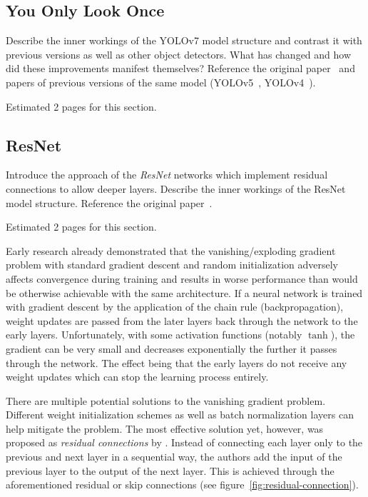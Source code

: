 \documentclass[draft,final]{vutinfth} %
\begin{document}
\subsection{You Only Look Once}
\label{sec:methods-detection}

Describe the inner workings of the YOLOv7 model structure and contrast
it with previous versions as well as other object detectors. What has
changed and how did these improvements manifest themselves? Reference
the original paper~\cite{wang2022} and papers of previous versions of
the same model (YOLOv5~\cite{jocher2022},
YOLOv4~\cite{bochkovskiy2020}).

Estimated 2 pages for this section.

\subsection{ResNet}
\label{sec:methods-classification}

Introduce the approach of the \emph{ResNet} networks which implement
residual connections to allow deeper layers. Describe the inner
workings of the ResNet model structure. Reference the original
paper~\cite{he2016}.

Estimated 2 pages for this section.

Early research \cite{bengio1994,glorot2010} already demonstrated that
the vanishing/exploding gradient problem with standard gradient
descent and random initialization adversely affects convergence during
training and results in worse performance than would be otherwise
achievable with the same architecture. If a neural network is trained
with gradient descent by the application of the chain rule
(backpropagation), weight updates are passed from the later layers
back through the network to the early layers. Unfortunately, with some
activation functions (notably $\tanh$), the gradient can be very small
and decreases exponentially the further it passes through the
network. The effect being that the early layers do not receive any
weight updates which can stop the learning process entirely.

There are multiple potential solutions to the vanishing gradient
problem. Different weight initialization schemes
\cite{glorot2010,sussillo2015} as well as batch normalization layers
\cite{ioffe2015} can help mitigate the problem. The most effective
solution yet, however, was proposed as \emph{residual connections} by
\textcite{he2016}. Instead of connecting each layer only to the
previous and next layer in a sequential way, the authors add the input
of the previous layer to the output of the next layer. This is
achieved through the aforementioned residual or skip connections (see
figure~\ref{fig:residual-connection}).
\end{document}
